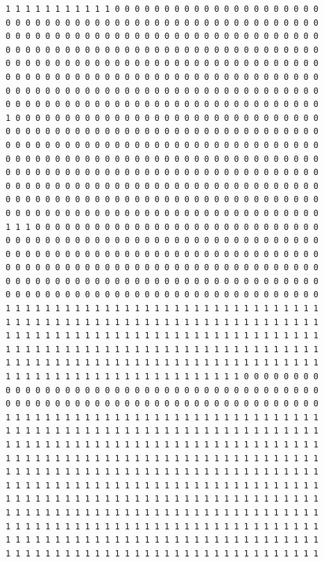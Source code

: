 \documentclass [10 pt, a4 paper]{report}
\begin{document}
\begin{lstlisting}[caption=Output of the simulation once it is finished, label={lst:code1}, frame=single]
1 1 1 1 1 1 1 1 1 1 1 0 0 0 0 0 0 0 0 0 0 0 0 0 0 0 0 0 0 0 0 0
0 0 0 0 0 0 0 0 0 0 0 0 0 0 0 0 0 0 0 0 0 0 0 0 0 0 0 0 0 0 0 0
0 0 0 0 0 0 0 0 0 0 0 0 0 0 0 0 0 0 0 0 0 0 0 0 0 0 0 0 0 0 0 0
0 0 0 0 0 0 0 0 0 0 0 0 0 0 0 0 0 0 0 0 0 0 0 0 0 0 0 0 0 0 0 0
0 0 0 0 0 0 0 0 0 0 0 0 0 0 0 0 0 0 0 0 0 0 0 0 0 0 0 0 0 0 0 0
0 0 0 0 0 0 0 0 0 0 0 0 0 0 0 0 0 0 0 0 0 0 0 0 0 0 0 0 0 0 0 0
0 0 0 0 0 0 0 0 0 0 0 0 0 0 0 0 0 0 0 0 0 0 0 0 0 0 0 0 0 0 0 0
0 0 0 0 0 0 0 0 0 0 0 0 0 0 0 0 0 0 0 0 0 0 0 0 0 0 0 0 0 0 0 0
1 0 0 0 0 0 0 0 0 0 0 0 0 0 0 0 0 0 0 0 0 0 0 0 0 0 0 0 0 0 0 0
0 0 0 0 0 0 0 0 0 0 0 0 0 0 0 0 0 0 0 0 0 0 0 0 0 0 0 0 0 0 0 0
0 0 0 0 0 0 0 0 0 0 0 0 0 0 0 0 0 0 0 0 0 0 0 0 0 0 0 0 0 0 0 0
0 0 0 0 0 0 0 0 0 0 0 0 0 0 0 0 0 0 0 0 0 0 0 0 0 0 0 0 0 0 0 0
0 0 0 0 0 0 0 0 0 0 0 0 0 0 0 0 0 0 0 0 0 0 0 0 0 0 0 0 0 0 0 0
0 0 0 0 0 0 0 0 0 0 0 0 0 0 0 0 0 0 0 0 0 0 0 0 0 0 0 0 0 0 0 0
0 0 0 0 0 0 0 0 0 0 0 0 0 0 0 0 0 0 0 0 0 0 0 0 0 0 0 0 0 0 0 0
0 0 0 0 0 0 0 0 0 0 0 0 0 0 0 0 0 0 0 0 0 0 0 0 0 0 0 0 0 0 0 0
1 1 1 0 0 0 0 0 0 0 0 0 0 0 0 0 0 0 0 0 0 0 0 0 0 0 0 0 0 0 0 0
0 0 0 0 0 0 0 0 0 0 0 0 0 0 0 0 0 0 0 0 0 0 0 0 0 0 0 0 0 0 0 0
0 0 0 0 0 0 0 0 0 0 0 0 0 0 0 0 0 0 0 0 0 0 0 0 0 0 0 0 0 0 0 0
0 0 0 0 0 0 0 0 0 0 0 0 0 0 0 0 0 0 0 0 0 0 0 0 0 0 0 0 0 0 0 0
0 0 0 0 0 0 0 0 0 0 0 0 0 0 0 0 0 0 0 0 0 0 0 0 0 0 0 0 0 0 0 0
0 0 0 0 0 0 0 0 0 0 0 0 0 0 0 0 0 0 0 0 0 0 0 0 0 0 0 0 0 0 0 0
1 1 1 1 1 1 1 1 1 1 1 1 1 1 1 1 1 1 1 1 1 1 1 1 1 1 1 1 1 1 1 1
1 1 1 1 1 1 1 1 1 1 1 1 1 1 1 1 1 1 1 1 1 1 1 1 1 1 1 1 1 1 1 1
1 1 1 1 1 1 1 1 1 1 1 1 1 1 1 1 1 1 1 1 1 1 1 1 1 1 1 1 1 1 1 1
1 1 1 1 1 1 1 1 1 1 1 1 1 1 1 1 1 1 1 1 1 1 1 1 1 1 1 1 1 1 1 1
1 1 1 1 1 1 1 1 1 1 1 1 1 1 1 1 1 1 1 1 1 1 1 1 1 1 1 1 1 1 1 1
1 1 1 1 1 1 1 1 1 1 1 1 1 1 1 1 1 1 1 1 1 1 1 1 0 0 0 0 0 0 0 0
0 0 0 0 0 0 0 0 0 0 0 0 0 0 0 0 0 0 0 0 0 0 0 0 0 0 0 0 0 0 0 0
0 0 0 0 0 0 0 0 0 0 0 0 0 0 0 0 0 0 0 0 0 0 0 0 0 0 0 0 0 0 0 0
1 1 1 1 1 1 1 1 1 1 1 1 1 1 1 1 1 1 1 1 1 1 1 1 1 1 1 1 1 1 1 1
1 1 1 1 1 1 1 1 1 1 1 1 1 1 1 1 1 1 1 1 1 1 1 1 1 1 1 1 1 1 1 1
1 1 1 1 1 1 1 1 1 1 1 1 1 1 1 1 1 1 1 1 1 1 1 1 1 1 1 1 1 1 1 1
1 1 1 1 1 1 1 1 1 1 1 1 1 1 1 1 1 1 1 1 1 1 1 1 1 1 1 1 1 1 1 1
1 1 1 1 1 1 1 1 1 1 1 1 1 1 1 1 1 1 1 1 1 1 1 1 1 1 1 1 1 1 1 1
1 1 1 1 1 1 1 1 1 1 1 1 1 1 1 1 1 1 1 1 1 1 1 1 1 1 1 1 1 1 1 1
1 1 1 1 1 1 1 1 1 1 1 1 1 1 1 1 1 1 1 1 1 1 1 1 1 1 1 1 1 1 1 1
1 1 1 1 1 1 1 1 1 1 1 1 1 1 1 1 1 1 1 1 1 1 1 1 1 1 1 1 1 1 1 1
1 1 1 1 1 1 1 1 1 1 1 1 1 1 1 1 1 1 1 1 1 1 1 1 1 1 1 1 1 1 1 1
1 1 1 1 1 1 1 1 1 1 1 1 1 1 1 1 1 1 1 1 1 1 1 1 1 1 1 1 1 1 1 1
1 1 1 1 1 1 1 1 1 1 1 1 1 1 1 1 1 1 1 1 1 1 1 1 1 1 1 1 1 1 1 1

\end{lstlisting}
\end{document}
